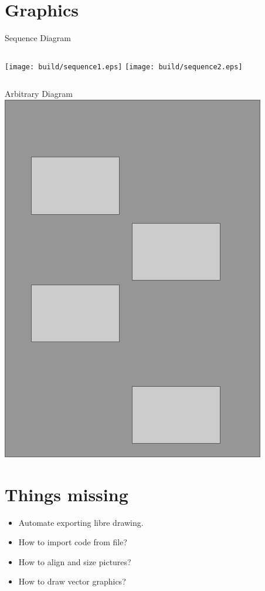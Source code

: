 \documentclass{beamer}
\begin{document}
\section{Graphics}

\begin{frame}{Sequence Diagram}
    \begin{columns}
            \texttt{[image: build/sequence1.eps]}
            \texttt{[image: build/sequence2.eps]}
    \end{columns}
\end{frame}

\begin{frame}{Arbitrary Diagram}
    \includegraphics[scale=0.6]{diagram.pdf}
\end{frame}

\section{Things missing}

\begin{frame}
    \begin{itemize}
        \item Automate exporting libre drawing.
        \item How to import code from file?
        \item How to align and size pictures?
        \item How to draw vector graphics?
    \end{itemize}
\end{frame}
\end{document}
